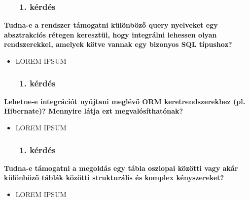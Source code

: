 \documentclass[
    aspectratio=169,
]{beamer}
\newcommand{\slidetitle}[2]{\frametitle{{\small #1 ~ \ding{226} ~ } \normalsize \textbf{#2} }}
\begin{document}
\begin{frame}[t,noframenumbering]
    \slidetitle{\sectionshorttitle}{1. kérdés}
    
    \textbf{%
    Tudna-e a rendszer támogatni különböző query nyelveket
    egy absztrakciós rétegen keresztül,
    hogy integrálni lehessen olyan rendszerekkel,
    amelyek kötve vannak egy bizonyos SQL típushoz?
    }
    
    \vspace{0.7cm}
    
    \begin{itemize}
        \setlength\itemsep{1em}
        \item LOREM IPSUM
    \end{itemize}
\end{frame}

\begin{frame}[t,noframenumbering]
    \slidetitle{\sectionshorttitle}{1. kérdés}
    
    \textbf{%
    Lehetne-e integrációt nyújtani meglévő ORM keretrendszerekhez
    (pl. Hibernate)?
    Mennyire látja ezt megvalósíthatónak?
    }
    
    \vspace{0.7cm}
    
    \begin{itemize}
        \setlength\itemsep{1em}
        \item LOREM IPSUM
    \end{itemize}
\end{frame}

\begin{frame}[t,noframenumbering]
    \slidetitle{\sectionshorttitle}{1. kérdés}
    
    \textbf{%
    Tudna-e támogatni a megoldás egy tábla oszlopai közötti
    vagy akár különböző táblák közötti
    strukturális és komplex kényszereket?
    }
    
    \vspace{0.7cm}
    
    \begin{itemize}
        \setlength\itemsep{1em}
        \item LOREM IPSUM
    \end{itemize}
\end{frame}

\endgroup
\end{document}
